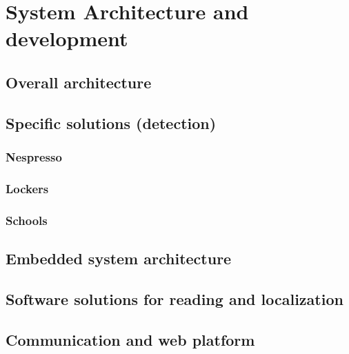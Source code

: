 \chapter{System Architecture and development}

\section{Overall architecture}

\section{Specific solutions (detection)}

\subsection{Nespresso}

\subsection{Lockers}

\subsection{Schools}

\section{Embedded system architecture}

\section{Software solutions for reading and localization}

\section{Communication and web platform}